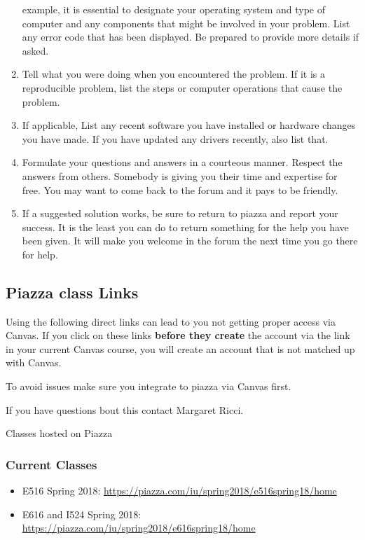 \begin{enumerate}
  example, it is essential to designate your operating system and type
  of computer and any components that might be involved in your problem.
  List any error code that has been displayed. Be prepared to provide
  more details if asked.
\item
  Tell what you were doing when you encountered the problem. If it is a
  reproducible problem, list the steps or computer operations that cause
  the problem.
\item
  If applicable, List any recent software you have installed or hardware
  changes you have made. If you have updated any drivers recently, also
  list that.
\item
  Formulate your questions and answers in a courteous manner. Respect
  the answers from others. Somebody is giving you their time and
  expertise for free. You may want to come back to the forum and it pays
  to be friendly.
\item
  If a suggested solution works, be sure to return to piazza and report
  your success. It is the least you can do to return something for the
  help you have been given. It will make you welcome in the forum the
  next time you go there for help.
\end{enumerate}

\subsection{Piazza class Links}\label{piazza-class-links}

Using the following direct links can lead to you not
getting proper access via Canvas. If you click on these links
\textbf{before they create} the account via the link in your current
Canvas course, you will create an account that is not matched up with
Canvas.

To avoid issues make sure you integrate to piazza via Canvas first.

If you have questions bout this contact Margaret Ricci.

Classes hosted on Piazza

\subsubsection{Current Classes}

\begin{itemize}
\item  E516 Spring 2018:          \url{https://piazza.com/iu/spring2018/e516spring18/home}
\item  E616 and I524 Spring 2018: \url{https://piazza.com/iu/spring2018/e616spring18/home}
\end{itemize}


